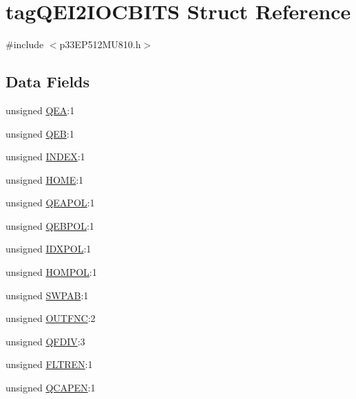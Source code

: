 \hypertarget{structtag_q_e_i2_i_o_c_b_i_t_s}{}\section{tag\+Q\+E\+I2\+I\+O\+C\+B\+I\+TS Struct Reference}
\label{structtag_q_e_i2_i_o_c_b_i_t_s}


{\ttfamily \#include $<$p33\+E\+P512\+M\+U810.\+h$>$}

\subsection*{Data Fields}
\begin{DoxyCompactItemize}
\item 
unsigned \hyperlink{structtag_q_e_i2_i_o_c_b_i_t_s_ad66d85d1b3facf757fc4a8d2dac405f4}{Q\+EA}\+:1
\item 
unsigned \hyperlink{structtag_q_e_i2_i_o_c_b_i_t_s_af72baafcec10f2280ff08f927d23bec4}{Q\+EB}\+:1
\item 
unsigned \hyperlink{structtag_q_e_i2_i_o_c_b_i_t_s_a2abd612f12243679e56dc81af03c241c}{I\+N\+D\+EX}\+:1
\item 
unsigned \hyperlink{structtag_q_e_i2_i_o_c_b_i_t_s_a13b64d5bd0cd26432e6ae0606b43dad7}{H\+O\+ME}\+:1
\item 
unsigned \hyperlink{structtag_q_e_i2_i_o_c_b_i_t_s_ac6f8d85f6c36e3bb941101a442c3fa45}{Q\+E\+A\+P\+OL}\+:1
\item 
unsigned \hyperlink{structtag_q_e_i2_i_o_c_b_i_t_s_acc4d6b7648aba40233c55b8e2fbd3b70}{Q\+E\+B\+P\+OL}\+:1
\item 
unsigned \hyperlink{structtag_q_e_i2_i_o_c_b_i_t_s_ac619785281fb989401e5c34e8fc802e1}{I\+D\+X\+P\+OL}\+:1
\item 
unsigned \hyperlink{structtag_q_e_i2_i_o_c_b_i_t_s_add17e149adc5b994bb4811c825cfdb40}{H\+O\+M\+P\+OL}\+:1
\item 
unsigned \hyperlink{structtag_q_e_i2_i_o_c_b_i_t_s_ac733d4f6fbe27b15c7b2968f3b544589}{S\+W\+P\+AB}\+:1
\item 
unsigned \hyperlink{structtag_q_e_i2_i_o_c_b_i_t_s_a4233484122ca33fd96b7a95f438fe574}{O\+U\+T\+F\+NC}\+:2
\item 
unsigned \hyperlink{structtag_q_e_i2_i_o_c_b_i_t_s_a22d6fb9c6c4624daa74340826a9a06cb}{Q\+F\+D\+IV}\+:3
\item 
unsigned \hyperlink{structtag_q_e_i2_i_o_c_b_i_t_s_ac89c6ee71679f74073d2a1f2503bb07e}{F\+L\+T\+R\+EN}\+:1
\item 
unsigned \hyperlink{structtag_q_e_i2_i_o_c_b_i_t_s_a0675b4c9b91f9b14a9c58b41e940b06b}{Q\+C\+A\+P\+EN}\+:1
\end{DoxyCompactItemize}


